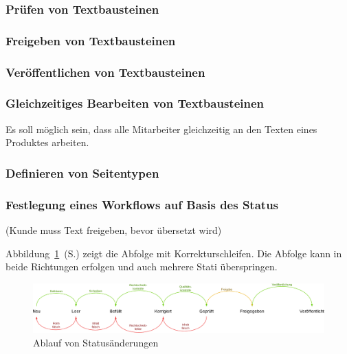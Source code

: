 \subsubsection{Prüfen von Textbausteinen}

\subsubsection{Freigeben von Textbausteinen}

\subsubsection{Veröffentlichen von Textbausteinen}

\subsubsection{Gleichzeitiges Bearbeiten von Textbausteinen}

Es soll möglich sein, dass alle  Mitarbeiter gleichzeitig an den Texten eines Produktes arbeiten.

\subsubsection{Definieren von Seitentypen}

\subsubsection{Festlegung eines Workflows auf Basis des Status}

(Kunde muss Text freigeben, bevor übersetzt wird)

Abbildung~\ref{chart:statimitworkflow}~(S.\pageref{chart:statimitworkflow}) zeigt die Abfolge mit Korrekturschleifen. Die Abfolge kann in beide Richtungen erfolgen und auch mehrere Stati überspringen.

\begin{figure}[htb]
\begin{center}
\includegraphics[width=\textwidth]{media/stati-mit-workflow.pdf}
\end{center}
\caption{Ablauf von Statusänderungen}
\label{chart:statimitworkflow}
\end{figure}

